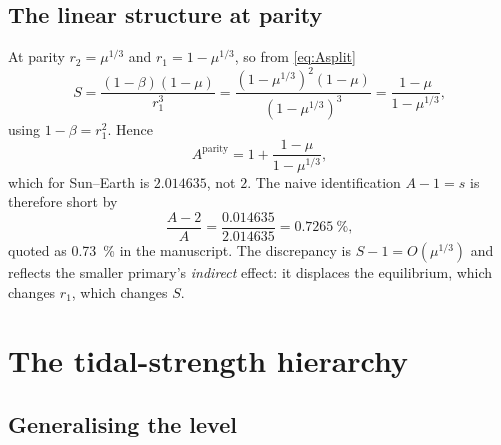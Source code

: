 \documentclass[11pt,a4paper]{article}
\begin{document}
\subsection{The linear structure at parity}

At parity $r_2=\mu^{1/3}$ and $r_1=1-\mu^{1/3}$, so from \eqref{eq:Asplit}
\begin{equation}
  S = \frac{(1-\beta)(1-\mu)}{r_1^3}
    = \frac{(1-\mu^{1/3})^2(1-\mu)}{(1-\mu^{1/3})^3}
    = \frac{1-\mu}{1-\mu^{1/3}} ,
\end{equation}
using $1-\beta=r_1^2$. Hence
\begin{equation}
  A^{\mathrm{parity}} = 1 + \frac{1-\mu}{1-\mu^{1/3}} ,
  \label{eq:Aparity}
\end{equation}
which for Sun--Earth is $2.014635$, not $2$. The naive identification
$A-1=s$ is therefore short by
\begin{equation}
  \frac{A-2}{A} = \frac{0.014635}{2.014635} = \SI{0.7265}{\percent},
\end{equation}
quoted as \SI{0.73}{\percent} in the manuscript. The discrepancy is
$S-1=O(\mu^{1/3})$ and reflects the smaller primary's \emph{indirect} effect:
it displaces the equilibrium, which changes $r_1$, which changes $S$.

\section{The tidal-strength hierarchy}\label{sec:kappa}

\subsection{Generalising the level}
\end{document}

